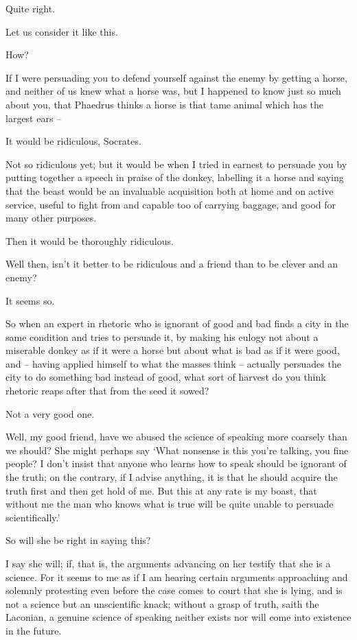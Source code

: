 Quite right.

Let us consider it like this.

 How?

If I were persuading you to defend yourself against the enemy
by getting a horse, and neither of us knew what a horse was, but I
happened to know just so much about you, that Phaedrus thinks a horse is
that tame animal which has the largest ears --

It would be ridiculous, Socrates. 

Not so ridiculous yet; but it would be when I tried in earnest
to persuade you by putting together a speech in praise of the donkey,
labelling it a horse and saying that the beast would be an invaluable
acquisition both at home and on active  service, useful to fight
from and capable too of carrying baggage, and good for many other
purposes.

Then it would be thoroughly ridiculous.

Well then, isn't it better to be ridiculous and a friend than
to be clever and an enemy?

It seems so. 

So when an expert in rhetoric who is ignorant of good and bad
finds a city in the same condition and tries to persuade it, by making
his eulogy not about a miserable donkey as if it were a horse but about
what is bad as if it were good, and -- having applied himself to what
the masses think -- actually persuades the city to do something bad
instead of good, what  sort of harvest do you think rhetoric
reaps after that from the  seed it sowed?

Not a very good one.

Well, my good friend, have we abused the science of speaking
more coarsely than we should? She might perhaps say ‘What nonsense is
this you're talking, you fine people?  I don't insist that
anyone who learns how to speak should be ignorant of the truth; on the
contrary, if I advise anything, it is that he should acquire the truth
first and then get hold of me. But this at any rate is my boast, that
without me the man who knows what is true will be quite unable to
persuade scientifically.'

So will she be right in saying this? 

I say she will; if, that is, the
arguments advancing on
her testify that she is a science. For it seems to me as if I am hearing
certain arguments approaching and solemnly protesting even before the
case comes to court that she is lying, and is not a science but an
unscientific knack; without a grasp of truth,  saith the
Laconian, a genuine
science of speaking neither exists nor will come into existence in the
future.

